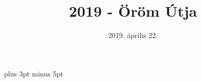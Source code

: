 \documentclass[a5paper,twoside]{article}
\title{2019 - Öröm Útja}
\date{2019. április 22.}
\renewcommand{\_}[1]{\underline{#1}} %
\begin{document}


  \versesep=12pt plus 3pt minus 5pt

  \begin{songs}{}
    
    
    
    
    
    
    
    
  \end{songs}

  
\end{document}
